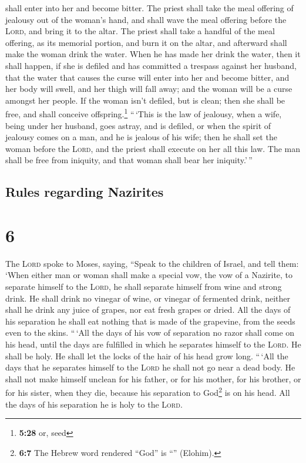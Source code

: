 shall enter into her and become bitter.  The priest shall
take the meal offering of jealousy out of the woman's hand, and shall
wave the meal offering before the \textsc{Lord}, and bring it to the
altar.  The priest shall take a handful of the meal
offering, as its memorial portion, and burn it on the altar, and
afterward shall make the woman drink the water.  When he
has made her drink the water, then it shall happen, if she is defiled
and has committed a trespass against her husband, that the water that
causes the curse will enter into her and become bitter, and her body
will swell, and her thigh will fall away; and the woman will be a curse
amongst her people.  If the woman isn't defiled, but is
clean; then she shall be free, and shall conceive offspring.\footnote{\textbf{5:28}
  or, seed}  ``\,`This is the law of jealousy, when a
wife, being under her husband, goes astray, and is defiled,
 or when the spirit of jealousy comes on a man, and he is
jealous of his wife; then he shall set the woman before the
\textsc{Lord}, and the priest shall execute on her all this law.
 The man shall be free from iniquity, and that woman
shall bear her iniquity.'\,''

\hypertarget{rules-regarding-nazirites}{%
\subsection{Rules regarding Nazirites}\label{rules-regarding-nazirites}}

\hypertarget{section-5}{%
\section{6}\label{section-5}}

 The \textsc{Lord} spoke to Moses, saying, 
``Speak to the children of Israel, and tell them: `When either man or
woman shall make a special vow, the vow of a Nazirite, to separate
himself to the \textsc{Lord},  he shall separate himself
from wine and strong drink. He shall drink no vinegar of wine, or
vinegar of fermented drink, neither shall he drink any juice of grapes,
nor eat fresh grapes or dried.  All the days of his
separation he shall eat nothing that is made of the grapevine, from the
seeds even to the skins.  ``\,`All the days of his vow of
separation no razor shall come on his head, until the days are fulfilled
in which he separates himself to the \textsc{Lord}. He shall be holy. He
shall let the locks of the hair of his head grow long. 
``\,`All the days that he separates himself to the \textsc{Lord} he
shall not go near a dead body.  He shall not make himself
unclean for his father, or for his mother, for his brother, or for his
sister, when they die, because his separation to God\footnote{\textbf{6:7}
  The Hebrew word rendered ``God'' is ``'' (Elohim).} is
on his head.  All the days of his separation he is holy to
the \textsc{Lord}.

